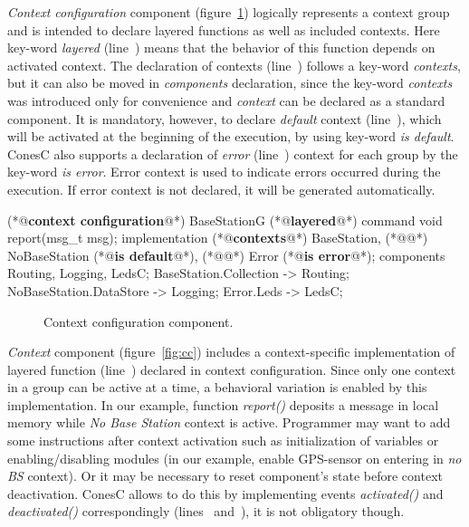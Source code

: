 \emph{Context configuration} component (figure~\ref{fig:ccc}) logically represents a context group and is intended to declare layered functions as well as included contexts. Here key-word \emph{layered} (line~) means that the behavior of this function depends on activated context. The declaration of contexts (line~) follows a key-word \emph{contexts}, but it can also be moved in \emph{components} declaration, since the key-word \emph{contexts} was introduced only for convenience and \emph{context} can be declared as a standard component. It is mandatory, however, to declare \emph{default} context (line~), which will be activated at the beginning of the execution, by using key-word \emph{is default}. ConesC also supports a declaration of \emph{error} (line~) context for each group by the key-word \emph{is error}. Error context is used to indicate errors occurred during the execution. If error context is not declared, it will be generated automatically.

\begin{Sbox}
\begin{minipage}{\columnwidth}
\begin{csource}
(*@\textbf{context configuration}@*) BaseStationG {
 (*@\textbf{layered}@*) command void report(msg_t msg);
}implementation {
 (*@\textbf{contexts}@*) BaseStation,
 (*@@*) NoBaseStation (*@\textbf{is default}@*),
 (*@@*) Error (*@\textbf{is error}@*);
 components Routing, Logging, LedsC;
 BaseStation.Collection -> Routing;
 NoBaseStation.DataStore -> Logging;
 Error.Leds -> LedsC;}
\end{csource}
\end{minipage}
\end{Sbox}
\begin{figure}[!h]
 \TheSbox
 \caption{Context configuration component.}
 \label{fig:ccc}
\end{figure}

\emph{Context} component (figure~\ref{fig:cc}) includes a context-specific implementation of layered function (line~) declared in context configuration. Since only one context in a group can be active at a time, a behavioral variation is enabled by this implementation. In our example, function \emph{report()} deposits a message in local memory while \emph{No Base Station} context is active. Programmer may want to add some instructions after context activation such as initialization of variables or enabling/disabling modules (in our example, enable GPS-sensor on entering in \emph{no BS} context). Or it may be necessary to reset component's state before context deactivation. ConesC allows to do this by implementing events \emph{activated()} and \emph{deactivated()} correspondingly (lines~ and~), it is not obligatory though.


